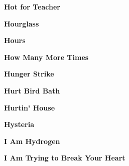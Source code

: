 \newline
\vspace{10pt} 
\begin{center}\textbf{Hot for Teacher}\end{center}
\newline
\vspace{10pt} 
\begin{center}\textbf{Hourglass}\end{center}
\newline
\vspace{10pt} 
\begin{center}\textbf{Hours}\end{center}
\newline
\vspace{10pt} 
\begin{center}\textbf{How Many More Times}\end{center}
\newline
\vspace{10pt} 
\begin{center}\textbf{Hunger Strike}\end{center}
\newline
\vspace{10pt} 
\begin{center}\textbf{Hurt Bird Bath}\end{center}
\newline
\vspace{10pt} 
\begin{center}\textbf{Hurtin' House}\end{center}
\newline
\vspace{10pt} 
\begin{center}\textbf{Hysteria}\end{center}
\newline
\vspace{10pt} 
\begin{center}\textbf{I Am Hydrogen}\end{center}
\newline
\vspace{10pt} 
\begin{center}\textbf{I Am Trying to Break Your Heart}\end{center}
